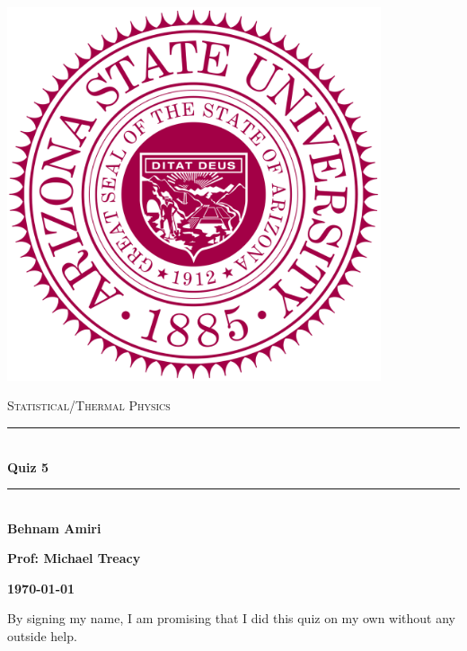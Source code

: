 \documentclass[fleqn]{article}
\begin{document}
  \begin{titlepage}

    \newcommand{\HRule}{\rule{\linewidth}{0.5mm}}

    \center

    \begin{center}
      \includegraphics[height=11cm, width=11cm]{asu.png}
    \end{center}

    \vline

    \textsc{\LARGE Statistical/Thermal Physics}\\[1.5cm]

    \HRule \\[0.5cm]
    { \huge \bfseries Quiz 5}\\[0.4cm] 
    \HRule \\[1.0cm]

    \textbf{Behnam Amiri}

    \bigbreak

    \textbf{Prof: Michael Treacy}

    \bigbreak

    \textbf{{\large \today}\\[2cm]}

    \vfill

  \end{titlepage}

  By signing my name, I am promising that I did this quiz on my own without any outside help.

  \vspace{0.5cm}
\end{document}
